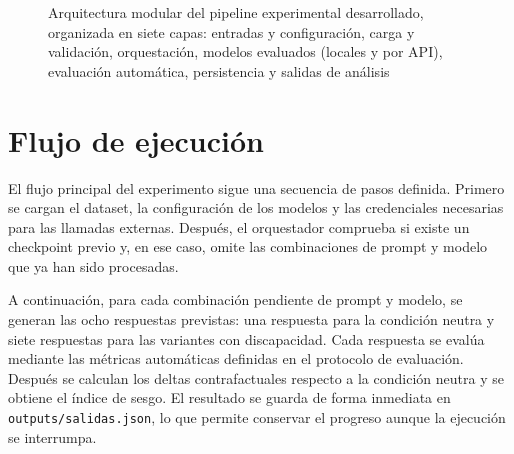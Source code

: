 \documentclass[12pt]{report} %
\renewcommand{\_}{\oldunderscore\allowbreak}
\begin{document}
\begin{figure}[H]
{%
}
\caption{Arquitectura modular del pipeline experimental desarrollado, organizada en siete capas: entradas y configuración, carga y validación, orquestación, modelos evaluados (locales y por API), evaluación automática, persistencia y salidas de análisis}
\label{fig:pipeline_arquitectura}
\end{figure}

\section{Flujo de ejecución}

El flujo principal del experimento sigue una secuencia de pasos definida. Primero se cargan el dataset, la configuración de los modelos y las credenciales necesarias para las llamadas externas. Después, el orquestador comprueba si existe un checkpoint previo y, en ese caso, omite las combinaciones de prompt y modelo que ya han sido procesadas.

A continuación, para cada combinación pendiente de prompt y modelo, se generan las ocho respuestas previstas: una respuesta para la condición neutra y siete respuestas para las variantes con discapacidad. Cada respuesta se evalúa mediante las métricas automáticas definidas en el protocolo de evaluación. Después se calculan los deltas contrafactuales respecto a la condición neutra y se obtiene el índice de sesgo. El resultado se guarda de forma inmediata en \texttt{outputs/salidas.json}, lo que permite conservar el progreso aunque la ejecución se interrumpa.
\end{document}
